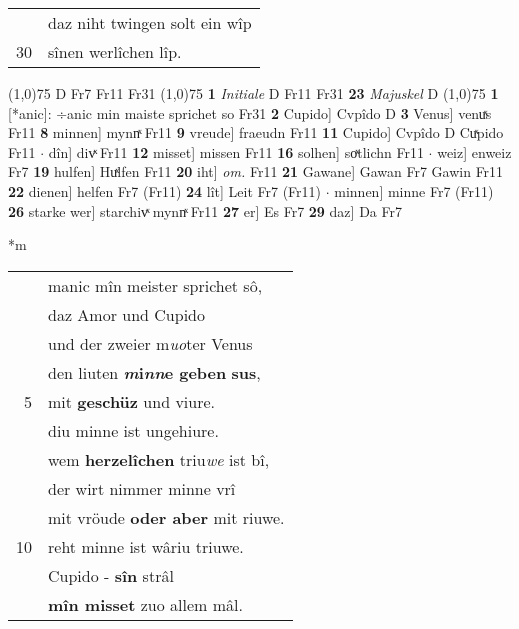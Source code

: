 \documentclass[8pt,a4paper,notitlepage]{article}
\begin{document}
\begin{table}[ht]
\begin{minipage}[t]{0.5\linewidth}
\begin{tabular}{rl}
 & daz niht twingen solt ein wîp\\ 
30 & sînen werlîchen lîp.\\ 
\end{tabular}
\scriptsize
\line(1,0){75} \newline
D Fr7 Fr11 Fr31 \newline
\line(1,0){75} \newline
\textbf{1} \textit{Initiale} D Fr11 Fr31  \textbf{23} \textit{Majuskel} D  \newline
\line(1,0){75} \newline
\textbf{1} [*anic]: ÷anic min maiste sprichet so Fr31 \textbf{2} Cupido] Cvpîdo D \textbf{3} Venus] venuͯs Fr11 \textbf{8} minnen] mynnͯ Fr11 \textbf{9} vreude] fraeudn Fr11 \textbf{11} Cupido] Cvpîdo D Cuͯpido Fr11  $\cdot$ dîn] divͯ Fr11 \textbf{12} misset] missen Fr11 \textbf{16} solhen] soͯtlichn Fr11  $\cdot$ weiz] enweiz Fr7 \textbf{19} hulfen] Huͯlfen Fr11 \textbf{20} iht] \textit{om.} Fr11 \textbf{21} Gawane] Gawan Fr7 Gawin Fr11 \textbf{22} dienen] helfen Fr7 (Fr11) \textbf{24} lît] Leit Fr7 (Fr11)  $\cdot$ minnen] minne Fr7 (Fr11) \textbf{26} starke wer] starchivͯ mynnͯ Fr11 \textbf{27} er] Es Fr7 \textbf{29} daz] Da Fr7 \newline
\end{minipage}
\hspace{0.5cm}
\begin{minipage}[t]{0.5\linewidth}
\small
\begin{center}*m
\end{center}
\begin{tabular}{rl}
 & manic mîn meister sprichet sô,\\ 
 & daz Amor und Cupido\\ 
 & und der zweier m\textit{uo}ter Venus\\ 
 & den liuten \textbf{\textit{m}i\textit{nn}e geben} \textbf{sus},\\ 
5 & mit \textbf{geschüz} und viure.\\ 
 & diu minne ist ungehiure.\\ 
 & wem \textbf{herzelîchen} triu\textit{we} ist bî,\\ 
 & der wirt nimmer minne vrî\\ 
 & mit vröude \textbf{oder aber} mit riuwe.\\ 
10 & reht minne ist wâriu triuwe.\\ 
 & Cupido - \textbf{sîn} strâl\\ 
 & \textbf{mîn misset} zuo allem mâl.\\ 

\end{tabular}
\end{minipage}
\end{table}
\end{document}
